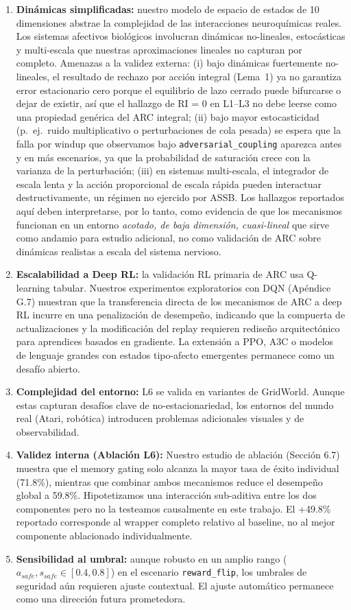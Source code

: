 \documentclass{article}
\begin{document}
\begin{enumerate}
    \item \textbf{Dinámicas simplificadas:} nuestro modelo de espacio de estados de 10 dimensiones abstrae la complejidad de las interacciones neuroquímicas reales. Los sistemas afectivos biológicos involucran dinámicas no-lineales, estocásticas y multi-escala que nuestras aproximaciones lineales no capturan por completo. Amenazas a la validez externa: (i) bajo dinámicas fuertemente no-lineales, el resultado de rechazo por acción integral (Lema~1) ya no garantiza error estacionario cero porque el equilibrio de lazo cerrado puede bifurcarse o dejar de existir, así que el hallazgo de RI = 0 en L1--L3 no debe leerse como una propiedad genérica del ARC integral; (ii) bajo mayor estocasticidad (p.\ ej.\ ruido multiplicativo o perturbaciones de cola pesada) se espera que la falla por windup que observamos bajo \texttt{adversarial\_coupling} aparezca antes y en más escenarios, ya que la probabilidad de saturación crece con la varianza de la perturbación; (iii) en sistemas multi-escala, el integrador de escala lenta y la acción proporcional de escala rápida pueden interactuar destructivamente, un régimen no ejercido por ASSB. Los hallazgos reportados aquí deben interpretarse, por lo tanto, como evidencia de que los mecanismos funcionan en un entorno \emph{acotado, de baja dimensión, cuasi-lineal} que sirve como andamio para estudio adicional, no como validación de ARC sobre dinámicas realistas a escala del sistema nervioso.
    \item \textbf{Escalabilidad a Deep RL:} la validación RL primaria de ARC usa Q-learning tabular. Nuestros experimentos exploratorios con DQN (Apéndice G.7) muestran que la transferencia directa de los mecanismos de ARC a deep RL incurre en una penalización de desempeño, indicando que la compuerta de actualizaciones y la modificación del replay requieren rediseño arquitectónico para aprendices basados en gradiente. La extensión a PPO, A3C o modelos de lenguaje grandes con estados tipo-afecto emergentes permanece como un desafío abierto.
    \item \textbf{Complejidad del entorno:} L6 se valida en variantes de GridWorld. Aunque estas capturan desafíos clave de no-estacionariedad, los entornos del mundo real (Atari, robótica) introducen problemas adicionales visuales y de observabilidad.
    \item \textbf{Validez interna (Ablación L6):} Nuestro estudio de ablación (Sección 6.7) muestra que el memory gating solo alcanza la mayor tasa de éxito individual (71.8\%), mientras que combinar ambos mecanismos reduce el desempeño global a 59.8\%. Hipotetizamos una interacción sub-aditiva entre los dos componentes pero no la testeamos causalmente en este trabajo. El +49.8\% reportado corresponde al wrapper completo relativo al baseline, no al mejor componente ablacionado individualmente.
    \item \textbf{Sensibilidad al umbral:} aunque robusto en un amplio rango ($a_{safe}, s_{safe} \in [0.4, 0.8]$) en el escenario \texttt{reward\_flip}, los umbrales de seguridad aún requieren ajuste contextual. El ajuste automático permanece como una dirección futura prometedora.
\end{enumerate}
\end{document}
